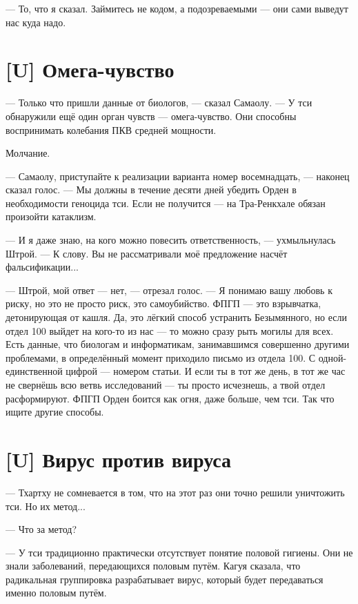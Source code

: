 --- То, что я сказал.
Займитесь не кодом, а подозреваемыми --- они сами выведут нас куда надо.

\section{[U] Омега-чувство}

\textspace

--- Только что пришли данные от биологов, --- сказал Самаолу.
--- У тси обнаружили ещё один орган чувств --- омега-чувство.
Они способны воспринимать колебания ПКВ средней мощности.

Молчание.

--- Самаолу, приступайте к реализации варианта номер восемнадцать, --- наконец сказал голос.
--- Мы должны в течение десяти дней убедить Орден в необходимости геноцида тси.
Если не получится --- на Тра-Ренкхале обязан произойти катаклизм.

--- И я даже знаю, на кого можно повесить ответственность, --- ухмыльнулась Штрой.
--- К слову.
Вы не рассматривали моё предложение насчёт фальсификации...

--- Штрой, мой ответ --- нет, --- отрезал голос.
--- Я понимаю вашу любовь к риску, но это не просто риск, это самоубийство.
ФПГП --- это взрывчатка, детонирующая от кашля.
Да, это лёгкий способ устранить Безымянного, но если отдел 100 выйдет на кого-то из нас --- то можно сразу рыть могилы для всех.
Есть данные, что биологам и информатикам, занимавшимся совершенно другими проблемами, в определённый момент приходило письмо из отдела 100.
С одной-единственной цифрой --- номером статьи.
И если ты в тот же день, в тот же час не свернёшь всю ветвь исследований --- ты просто исчезнешь, а твой отдел расформируют.
ФПГП Орден боится как огня, даже больше, чем тси.
Так что ищите другие способы.

\section{[U] Вирус против вируса}

\textspace

--- Тхартху не сомневается в том, что на этот раз они точно решили уничтожить тси.
Но их метод...

--- Что за метод?

--- У тси традиционно практически отсутствует понятие половой гигиены.
Они не знали заболеваний, передающихся половым путём.
Кагуя сказала, что радикальная группировка разрабатывает вирус, который будет передаваться именно половым путём.

